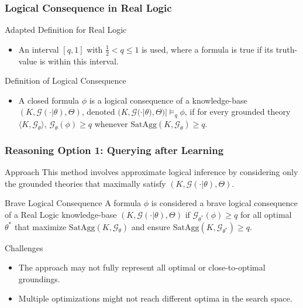 \documentclass{beamer}
\newcommand{\G}{\mathcal{G}}
\begin{document}
\begin{frame}
\frametitle{Logical Consequence in Real Logic}
\begin{block}{Adapted Definition for Real Logic}
\begin{itemize}
    \item An interval \([q, 1]\) with \( \frac{1}{2} < q \leq 1\) is used, where a formula is true if its truth-value is within this interval.
\end{itemize}
\end{block}

\begin{block}{Definition of Logical Consequence}
\begin{itemize}
\item A closed formula \(\phi\) is a logical consequence of a
  knowledge-base \((K, \G(\cdot | \theta), \Theta)\), denoted
  \((K, \G(\cdot | \theta), \Theta) | \models_q \phi\), if for every
  grounded theory \(\langle K, \G_\theta \rangle\),
  \(\G_\theta(\phi) \geq q\) whenever
  \(\text{SatAgg}(K, \G_\theta) \geq q\).
\end{itemize}
\end{block}
\end{frame}

\begin{frame}
\frametitle{Reasoning Option 1: Querying after Learning}
\begin{block}{Approach}
This method involves approximate logical inference by considering only the grounded theories that maximally satisfy \( (K, \G(\cdot | \theta), \Theta) \).
\end{block}

\begin{block}{Brave Logical Consequence}
A formula \( \phi \) is considered a brave logical consequence of a Real Logic knowledge-base \( (K, \G(\cdot | \theta), \Theta) \) if \( \G_{\theta^*}(\phi) \geq q \) for all optimal \( \theta^* \) that maximize \( \text{SatAgg}(K, \G_\theta) \) and ensure \( \text{SatAgg}(K, \G_{\theta^*}) \geq q \).
\end{block}

\begin{block}{Challenges}
\begin{itemize}
    \item The approach may not fully represent all optimal or close-to-optimal groundings.
    \item Multiple optimizations might not reach different optima in the search space.
\end{itemize}
\end{block}
\end{frame}
\end{document}

